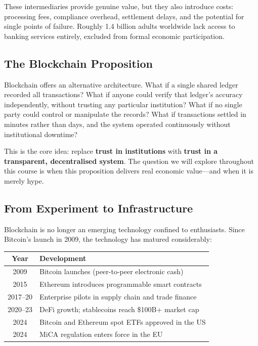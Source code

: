 \documentclass[11pt,a4paper]{article}
\newcommand{\keyword}[1]{\textbf{\textcolor{AccentOrange}{#1}}}
\begin{document}
These intermediaries provide genuine value, but they also introduce costs: processing fees, compliance overhead, settlement delays, and the potential for single points of failure. Roughly 1.4 billion adults worldwide lack access to banking services entirely, excluded from formal economic participation.

\subsection{The Blockchain Proposition}

Blockchain offers an alternative architecture. What if a single shared ledger recorded all transactions? What if anyone could verify that ledger's accuracy independently, without trusting any particular institution? What if no single party could control or manipulate the records? What if transactions settled in minutes rather than days, and the system operated continuously without institutional downtime?

This is the core idea: replace \keyword{trust in institutions} with \keyword{trust in a transparent, decentralised system}. The question we will explore throughout this course is when this proposition delivers real economic value---and when it is merely hype.

\subsection{From Experiment to Infrastructure}

Blockchain is no longer an emerging technology confined to enthusiasts. Since Bitcoin's launch in 2009, the technology has matured considerably:

\begin{center}
\begin{tabular}{cl}
\toprule
\textbf{Year} & \textbf{Development} \\
\midrule
2009 & Bitcoin launches (peer-to-peer electronic cash) \\
2015 & Ethereum introduces programmable smart contracts \\
2017--20 & Enterprise pilots in supply chain and trade finance \\
2020--23 & DeFi growth; stablecoins reach \$100B+ market cap \\
2024 & Bitcoin and Ethereum spot ETFs approved in the US \\
2024 & MiCA regulation enters force in the EU \\
\bottomrule
\end{tabular}
\end{center}
\end{document}
